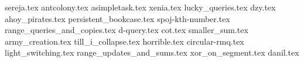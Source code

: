\listofproblems
\pagebreak
{sereja.tex}
\pagebreak
{antcolony.tex}
\pagebreak
{asimpletask.tex}
\pagebreak
{xenia.tex}
\pagebreak
{lucky_queries.tex}
\pagebreak
{dzy.tex}
\pagebreak
{ahoy_pirates.tex}
\pagebreak
{persistent_bookcase.tex}
\pagebreak
{spoj-kth-number.tex}
\pagebreak
{range_queries_and_copies.tex}
\pagebreak
{d-query.tex}
\pagebreak
{cot.tex}
\pagebreak
{smaller_sum.tex}
\pagebreak
{army_creation.tex}
\pagebreak
{till_i_collapse.tex}
\pagebreak
{horrible.tex}
\pagebreak
{circular-rmq.tex}
\pagebreak
{light_switching.tex}
\pagebreak
{range_updates_and_sums.tex}
\pagebreak
{xor_on_segment.tex}
\pagebreak
{danil.tex}